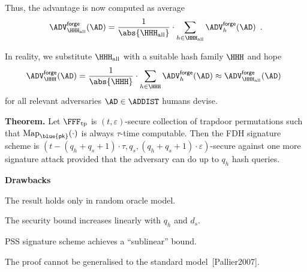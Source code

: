 \documentclass[landscape,footrule]{foils}
\renewcommand{\PK}{{\blue{\mathsf{pk}}}}
\newcommand{\HALL}{\HHH_{\mathrm{all}}}
\begin{document}
Thus, the advantage is now computed as average
\begin{align*}
  \advFORGEXX{\HALL}{\AD}=\frac{1}{\abs{\HALL}}\cdot\sum_{h\in\HALL}\advFORGEXX{h}{\AD}\enspace.
\end{align*}


In reality, we substitute $\HALL$ with a suitable hash family $\HHH$
and hope
\begin{align*}
  \advFORGEXX{\HHH}{\AD}=\frac{1}{\abs{\HHH}}\cdot\sum_{h\in\HHH}\advFORGEXX{h}{\AD}
  \approx \advFORGEXX{\HALL}{\AD}\enspace
\end{align*}
for all relevant adversaries $\AD\in\ADDIST$ humans devise.


\textbf{Theorem.} Let $\FFFTPERM$ is $(t,\varepsilon)$-secure
collection of trapdoor permutations such that $\MAP_\PK(\cdot)$ is
always $\tau$-time computable. Then the FDH signature scheme is
$(t-(q_h+q_s+1)\cdot\tau,q_s,(q_h+q_s+1)\cdot\varepsilon)$-secure
against one more signature attack provided that the adversary can do
up to $q_h$ hash queries.\vspace*{1cm}


\textbf{Drawbacks}
\begin{triangles}
  \item The result holds only in random oracle model.
  \item The security bound increases linearly with $q_h$ and $d_s$.
  \item PSS signature scheme achieves a ``sublinear'' bound. 
  \item The proof cannot be generalised to the standard model~[Pallier2007].
\end{triangles}

\end{document}
